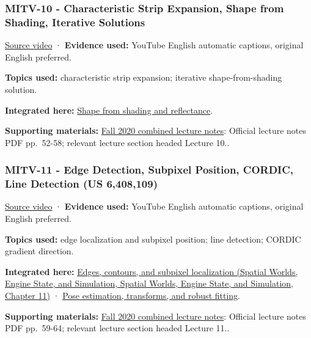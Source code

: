 \subsubsection{MITV-10 - Characteristic Strip Expansion, Shape from Shading, Iterative Solutions}\label{04-visual-computing-ii-ch036-mitv-10---characteristic-strip-expansion-shape-from-shading-iterative-solutions}

\href{https://www.youtube.com/watch?v=XSUjp-cDyeY}{Source video} · \textbf{Evidence used:} YouTube English automatic captions, original English preferred.

\textbf{Topics used:} characteristic strip expansion; iterative shape-from-shading solution.

\textbf{Integrated here:} \hyperref[04-visual-computing-ii-ch032-shape-from-shading-and-reflectance]{Shape from shading and reflectance}.

\textbf{Supporting materials:} \href{https://ocw.mit.edu/courses/6-801-machine-vision-fall-2020/9ec44f69e72995c370b3797818ba01e6_MIT6_801F20_lectureNotes.pdf}{Fall 2020 combined lecture notes}: Official lecture notes PDF pp.~52-58; relevant lecture section headed Lecture 10..

\subsubsection{MITV-11 - Edge Detection, Subpixel Position, CORDIC, Line Detection (US 6,408,109)}\label{04-visual-computing-ii-ch036-mitv-11---edge-detection-subpixel-position-cordic-line-detection-us-6408109}

\href{https://www.youtube.com/watch?v=kjCQ2DUn55Y}{Source video} · \textbf{Evidence used:} YouTube English automatic captions, original English preferred.

\textbf{Topics used:} edge localization and subpixel position; line detection; CORDIC gradient direction.

\textbf{Integrated here:} \href{../05-Spatial-Worlds-Engine-State-and-Simulation/main.pdf\#nameddest=04-visual-computing-ii-ch030-edges-contours-and-subpixel-localization}{Edges, contours, and subpixel localization (Spatial Worlds, Engine State, and Simulation, Spatial Worlds, Engine State, and Simulation, Chapter 11)} · \hyperref[04-visual-computing-ii-ch032-pose-estimation-transforms-and-robust-fitting]{Pose estimation, transforms, and robust fitting}.

\textbf{Supporting materials:} \href{https://ocw.mit.edu/courses/6-801-machine-vision-fall-2020/9ec44f69e72995c370b3797818ba01e6_MIT6_801F20_lectureNotes.pdf}{Fall 2020 combined lecture notes}: Official lecture notes PDF pp.~59-64; relevant lecture section headed Lecture 11..

